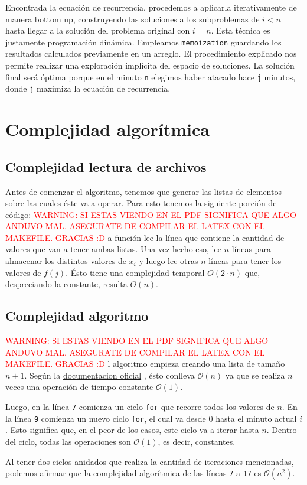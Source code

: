 \documentclass{article}
\newcommand{\docuPy}{%
  {\href{https://wiki.python.org/moin/TimeComplexity}{documentacion oficial}}
  }%
\newcommand{\funcionArchivo}[2]{%
  {\textcolor{red}{WARNING: SI ESTAS VIENDO EN EL PDF SIGNIFICA QUE ALGO ANDUVO MAL. ASEGURATE DE COMPILAR EL LATEX CON EL MAKEFILE. GRACIAS :D}}
  }%
\begin{document}
Encontrada la ecuación de recurrencia, procedemos a aplicarla iterativamente de manera bottom up, construyendo las soluciones a los subproblemas de $i < n$ hasta llegar a la solución del problema original con $i = n$. Esta técnica es justamente programación dinámica. Empleamos \texttt{memoization} guardando los resultados calculados previamente en un arreglo. El procedimiento explicado nos permite realizar una exploración implícita del espacio de soluciones. La solución final será óptima porque en el minuto \texttt{n} elegimos haber atacado hace \texttt{j} minutos, donde \texttt{j} maximiza la ecuación de recurrencia.

\section{Complejidad algorítmica}
\subsection{Complejidad lectura de archivos}
Antes de comenzar el algoritmo, tenemos que generar las listas de elementos sobre las cuales éste va a operar.
Para esto tenemos la siguiente porción de código:
\funcionArchivo{codigo/archivos.py generarTestDe}

La función lee la línea que contiene la cantidad de valores que van a tener ambas listas. Una vez hecho eso, lee $n$ líneas para almacenar los distintos valores de $x_i$ y luego lee otras $n$ líneas para tener los valores de $f(j)$. Ésto tiene una complejidad temporal $O(2\cdot n)$ que, despreciando la constante, resulta $O(n)$.

\subsection{Complejidad algoritmo}
\funcionArchivo{codigo/algoritmo.py eliminar_enemigos}
El algoritmo empieza creando una lista de tamaño $n + 1$. Según la \docuPy, ésto conlleva $\mathcal{O}(n)$ ya que se realiza $n$ veces una operación de tiempo constante $\mathcal{O}(1)$.

Luego, en la línea \texttt{7} comienza un ciclo \texttt{for} que recorre todos los valores de $n$. En la línea \texttt{9} comienza un nuevo ciclo \texttt{for}, el cual va desde 0 hasta el minuto actual $i$. Esto significa que, en el peor de los casos, este ciclo va a iterar hasta $n$. Dentro del ciclo, todas las operaciones son $\mathcal{O}(1)$, es decir, constantes.

Al tener dos ciclos anidados que realiza la cantidad de iteraciones mencionadas, podemos afirmar que la complejidad algorítmica de las líneas \texttt{7} a \texttt{17} es $\mathcal{O}(n^2)$.
\end{document}
